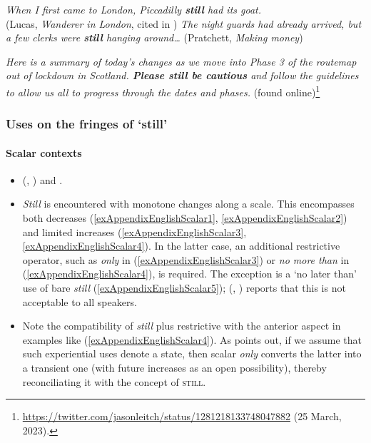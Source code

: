 \begin{exe}
	\ex \textit{When I first came to London, Piccadilly \textbf{still} had its goat.}
	\\(Lucas, \textit{Wanderer in London}, cited in \cite[s.v. \textit{still}]{OED2022})
	\ex \textit{The night guards had already arrived, but a few clerks were \textbf{still} hanging around…} (Pratchett, \textit{Making money})
	
	\ex\label{exAppendixEnglish3}	
	\textit{Here is a summary of today’s changes as we move into Phase 3 of the routemap out of lockdown in Scotland. \textbf{Please still be cautious} and follow the guidelines to allow us all to progress through the dates and phases.} (found online)\footnote{\url{https://twitter.com/jasonleitch/status/1281218133748047882} (25 March, 2023).}
\end{exe}

\subsubsection{Uses on the fringes of \lq{}still\rq{}}
\paragraph{Scalar contexts}\label{appendixEnglishScalar}
\begin{itemize}
	\item \citeauthor{Ippolito2004} (\citeyear{Ippolito2004}, \citeyear{Ippolito2007}) and \textcite{Michaelis1993}.
	\item \textit{Still} is encountered with monotone changes along a scale. This encompasses both decreases (\ref{exAppendixEnglishScalar1}, \ref{exAppendixEnglishScalar2}) and limited increases (\ref{exAppendixEnglishScalar3}, \ref{exAppendixEnglishScalar4}). In the latter case, an additional restrictive operator, such as \textit{only} in (\ref{exAppendixEnglishScalar3}) or \textit{no more than} in (\ref{exAppendixEnglishScalar4}), is required. The exception is a \lq{}no later than\rq{ }use of bare \textit{still} (\ref{exAppendixEnglishScalar5}); \citeauthor{Ippolito2004} (\citeyear{Ippolito2004}, \citeyear{Ippolito2007})  reports that this is not acceptable to all speakers.
	\item Note the compatibility of \textit{still} plus restrictive with the anterior aspect in examples like (\ref{exAppendixEnglishScalar4}). As \textcite{Michaelis1993} points out, if we assume that such experiential uses denote a state, then scalar \textit{only} converts the latter into a transient one (with future increases as an open possibility), thereby reconciliating it with the concept of \textsc{still}.	
\end{itemize}

